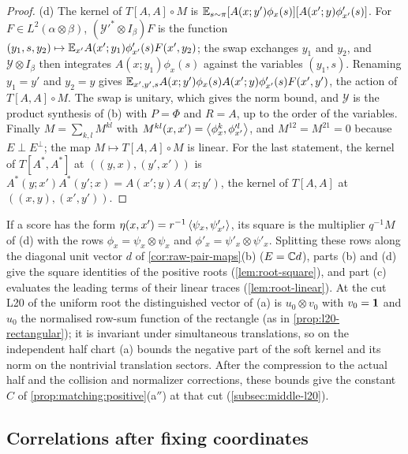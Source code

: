 \begin{proof}
(d) The kernel of $T[A,A]\circ M$ is
$\mathbb E_{s\sim\pi}[A(x;y')\phi_x(s)][A(x';y)\phi'_{x'}(s)]$. For
$F\in L^2(\alpha\otimes\beta)$, $(\mathcal Y'^*\otimes I_\beta)F$ is the function
$(y_1,s,y_2)\mapsto\mathbb E_{x'}A(x';y_1)\phi'_{x'}(s)F(x',y_2)$; the swap exchanges
$y_1$ and $y_2$, and $\mathcal Y\otimes I_\beta$ then integrates
$A(x;y_1)\phi_x(s)$ against the variables $(y_1,s)$. Renaming $y_1=y'$ and
$y_2=y$ gives $\mathbb E_{x',y',s}A(x;y')\phi_x(s)A(x';y)\phi'_{x'}(s)F(x',y')$, the
action of $T[A,A]\circ M$. The swap is unitary, which gives the norm bound, and
$\mathcal Y$ is the product synthesis of (b) with $P=\Phi$ and $R=A$, up to the
order of the variables. Finally $M=\sum_{k,l}M^{kl}$ with
$M^{kl}(x,x')=\left\langle \phi^k_x,\phi'^l_{x'}\right\rangle$, and $M^{12}=M^{21}=0$ because
$E\perp E^\perp$; the map $M\mapsto T[A,A]\circ M$ is linear. For the last
statement, the kernel of $T[A^*,A^*]$ at $((y,x),(y',x'))$ is
$A^*(y;x')A^*(y';x)=A(x';y)A(x;y')$, the kernel of $T[A,A]$ at
$((x,y),(x',y'))$.
\end{proof}

If a score has the form $\eta(x,x')=r^{-1}\left\langle \psi_x,\psi'_{x'}\right\rangle$, its square
is the multiplier $q^{-1}M$ of (d) with the rows $\phi_x=\psi_x\otimes\psi_x$ and
$\phi'_x=\psi'_x\otimes\psi'_x$. Splitting these rows along the diagonal unit
vector $d$ of \cref{cor:raw-pair-maps}(b) ($E=\mathbb C d$), parts (b) and (d) give the
square identities of the positive roots (\cref{lem:root-square}), and part (c)
evaluates the leading terms of their linear traces (\cref{lem:root-linear}).
At the cut L20 of the uniform root the distinguished vector of (a) is
$u_0\otimes v_0$ with $v_0=\mathbf 1$ and $u_0$ the normalised
row-sum function of the rectangle (as in
\cref{prop:l20-rectangular}); it is invariant under simultaneous
translations, so on the
independent half chart (a) bounds the negative part of the soft kernel and its
norm on the nontrivial translation sectors. After the compression to the actual
half and the collision and normalizer corrections, these bounds give the
constant $C$ of \cref{prop:matching:positive}(a$''$) at that cut
(\cref{subsec:middle-l20}).

\subsection{Correlations after fixing coordinates}\label{subsec:cuts:influence}

